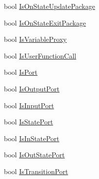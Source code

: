 \begin{DoxyCompactItemize}
\item 
bool \hyperlink{classi_c_s___engine_object_a46dcab89d6b15772c1df744495e5d1ff}{Is\+On\+State\+Update\+Package}
\item 
bool \hyperlink{classi_c_s___engine_object_a33cd8eef8295dc2fa78470fc87da3fd7}{Is\+On\+State\+Exit\+Package}
\item 
bool \hyperlink{classi_c_s___engine_object_ab6e242370f4a478a88062b74c8078687}{Is\+Variable\+Proxy}
\item 
bool \hyperlink{classi_c_s___engine_object_a62e99c663cbfcee672e451f4f9a462db}{Is\+User\+Function\+Call}
\item 
bool \hyperlink{classi_c_s___engine_object_a77984d6277ad1bdc00d086e892b148b3}{Is\+Port}
\item 
bool \hyperlink{classi_c_s___engine_object_ab8ad56bcc05125043e7a350d209163e7}{Is\+Output\+Port}
\item 
bool \hyperlink{classi_c_s___engine_object_afcf1cf177e6d18a355c87d06142046f9}{Is\+Input\+Port}
\item 
bool \hyperlink{classi_c_s___engine_object_a9d8a084f26170592a5871772f8a4ecce}{Is\+State\+Port}
\item 
bool \hyperlink{classi_c_s___engine_object_a8e8f5f2987ec22b8cede2106a3d58a13}{Is\+In\+State\+Port}
\item 
bool \hyperlink{classi_c_s___engine_object_aad6cf06ffce7d78fe774671ef3ba4e55}{Is\+Out\+State\+Port}
\item 
bool \hyperlink{classi_c_s___engine_object_afe43286c50e7ec7e930254534e0cb35f}{Is\+Transition\+Port}
\item 

\end{DoxyCompactItemize}
